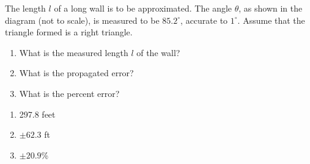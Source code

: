 {\label{exer:04_04_ex_35} The length $l$ of a long wall is to be approximated. The angle $\theta$, as shown in the diagram (not to scale), is measured to be $85.2^\circ$, accurate to $1^\circ$. Assume that the triangle formed is a right triangle.

\begin{minipage}{\linewidth}
\centering
{}
\end{minipage}

\begin{enumerate}
\item		What is the measured length $l$ of the wall?
\item		What is the propagated error? 
\item		What is the percent error?
\end{enumerate}
}
{\begin{enumerate}
\item		297.8 feet
\item		$\pm 62.3$ ft
\item		$\pm 20.9$\% 
\end{enumerate}
}

